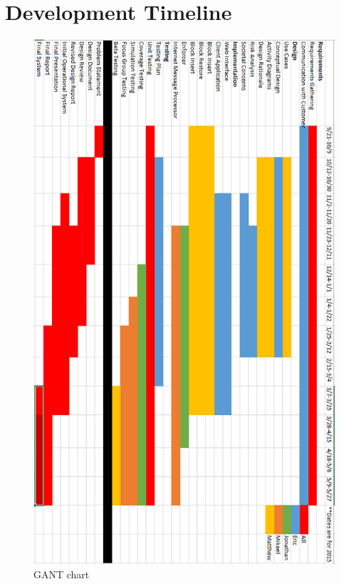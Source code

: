 \chapter{Development Timeline}

\begin{figure}[h]
	\centering
\includegraphics[scale=0.90]{images/GANT.png}
	\caption{GANT chart}
	\label{fig:gant}
\end{figure}